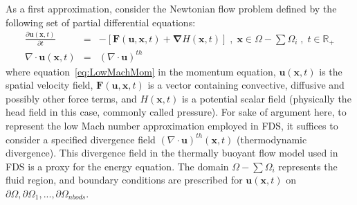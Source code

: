 As a first approximation, consider the Newtonian flow problem defined by the following set of partial differential equations:
%
\begin{eqnarray}
  \frac{\partial \mathbf{u}(\mathbf{x},t)}{\partial t} &=& - \left[ \mathbf{F}(\mathbf{u},\mathbf{x},t) + \boldsymbol{\nabla} H(\mathbf{x},t) \right] \; , \; \mathbf{x} \in \Omega - \sum{\Omega_i} \; , \; t \in \mathbb{R}_+ \label{eq:LowMachMom} \\
         \nabla \cdot \mathbf{u} (\mathbf{x},t) & = & \left(\nabla \cdot \mathbf{u} \right)^{th} \label{eq:LowMachDiv}
\end{eqnarray}
%
where equation~\eqref{eq:LowMachMom} in the momentum equation, $\mathbf{u}(\mathbf{x},t)$ is the spatial velocity field, $\mathbf{F}(\mathbf{u},\mathbf{x},t)$ is a vector containing convective, diffusive and possibly other force terms, and $H(\mathbf{x},t)$ is a potential scalar field (physically the head field in this case, commonly called pressure). For sake of argument here, to represent the low Mach number approximation employed in FDS, it suffices to consider a specified divergence field $\left(\nabla \cdot \mathbf{u} \right)^{th} (\mathbf{x},t)$ (thermodynamic divergence). This divergence field in the thermally buoyant flow model used in FDS is a proxy for the energy equation.
The domain $\Omega - \sum{\Omega_i}$ represents the fluid region, and boundary conditions are prescribed for $\mathbf{u}(\mathbf{x},t)$ on $\partial \Omega,\partial \Omega_1,...,\partial \Omega_{nbods}$.

